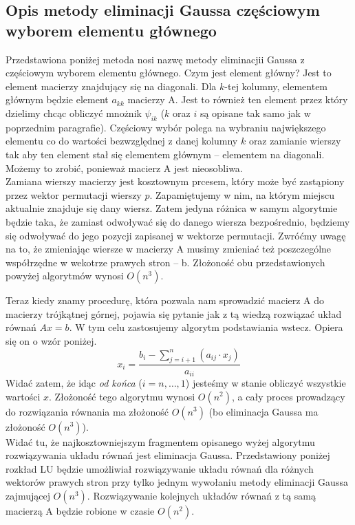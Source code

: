 \documentclass[]{article}
\begin{document}
	\subsection*{Opis metody eliminacji Gaussa częściowym wyborem elementu głównego}
	Przedstawiona poniżej metoda nosi nazwę metody eliminacjii Gaussa z częściowym wyborem elementu głównego.
	Czym jest element główny? Jest to element macierzy znajdujący się na diagonali. Dla $k$-tej kolumny, elementem głównym będzie element $a_{kk}$ macierzy A. Jest to również ten element przez który dzielimy chcąc obliczyć mnożnik $\psi_{ik}$ ($k$ oraz $i$ są opisane tak samo jak w poprzednim paragrafie). Częściowy wybór polega na wybraniu największego elementu co do wartości bezwzględnej z danej kolumny $k$ oraz zamianie wierszy tak aby ten element stał się elementem głównym -- elementem na diagonali. Możemy to zrobić, ponieważ macierz A jest nieosobliwa. \\
	Zamiana wierszy macierzy jest kosztownym prcesem, który może być zastąpiony przez wektor permutacji wierszy $p$. Zapamiętujemy w nim, na którym miejscu aktualnie znajduje się dany wiersz. Zatem jedyna różnica w samym algorytmie będzie taka, że zamiast odwoływać się do danego wiersza bezpośrednio, będziemy się odwoływać do jego pozycji zapisanej w wektorze permutacji. Zwróćmy uwagę na to, że zmieniając wiersze w macierzy A musimy zmieniać też poszczególne współrzędne w wekotrze prawych stron -- b. Złożoność obu przedstawionych powyżej algorytmów wynosi $O(n^3)$.
	
	Teraz kiedy znamy procedurę, która pozwala nam sprowadzić macierz A do macierzy trójkątnej górnej, pojawia się pytanie jak z tą wiedzą rozwiązać układ równań $Ax = b$. W tym celu zastosujemy algorytm podstawiania wstecz. Opiera się on o wzór poniżej.
	$$x_i = \frac{b_i - \sum_{j = i+1}^n (a_{ij} \cdot x_j)}{a_{ii}}$$
	\clearpage
	Widać zatem, że idąc \textit{od końca} ($i=n,\ldots,1$) jesteśmy w stanie obliczyć wszystkie wartości $x$. Złożoność tego algorytmu wynosi $O(n^2)$, a cały proces prowadzący do rozwiązania równania ma złożoność $O(n^3)$ (bo eliminacja Gaussa ma złożoność $O(n^3)$). \\
	Widać tu, że najkosztowniejszym fragmentem opisanego wyżej algorytmu rozwiązywania układu równań jest eliminacja Gaussa. Przedstawiony poniżej rozkład LU będzie umożliwiał rozwiązywanie układu równań dla różnych wektorów prawych stron przy tylko jednym wywołaniu metody eliminacji Gaussa zajmującej $O(n^3)$. Rozwiązywanie kolejnych układów równań z tą samą macierzą A będzie robione w czasie $O(n^2)$.
	
\end{document}
